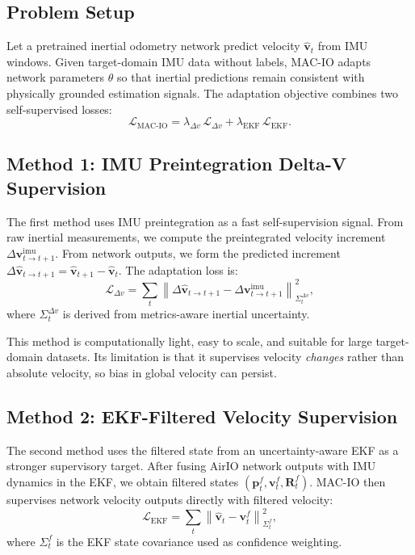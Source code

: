 \subsection{Problem Setup}

Let a pretrained inertial odometry network predict velocity $\hat{\mathbf{v}}_t$ from IMU windows.
Given target-domain IMU data without labels, MAC-IO adapts network parameters $\theta$ so that inertial predictions remain consistent with physically grounded estimation signals.
The adaptation objective combines two self-supervised losses:
\begin{equation}
\label{eq:macio:total}
\mathcal{L}_{\text{MAC-IO}} =
\lambda_{\Delta v}\,\mathcal{L}_{\Delta v}
+
\lambda_{\text{EKF}}\,\mathcal{L}_{\text{EKF}}.
\end{equation}

\subsection{Method 1: IMU Preintegration Delta-V Supervision}

The first method uses IMU preintegration as a fast self-supervision signal.
From raw inertial measurements, we compute the preintegrated velocity increment $\Delta\mathbf{v}^{\text{imu}}_{t\rightarrow t+1}$.
From network outputs, we form the predicted increment $\Delta\hat{\mathbf{v}}_{t\rightarrow t+1} = \hat{\mathbf{v}}_{t+1} - \hat{\mathbf{v}}_{t}$.
The adaptation loss is:
\begin{equation}
\label{eq:macio:deltav}
\mathcal{L}_{\Delta v} =
\sum_{t}
\left\|
\Delta\hat{\mathbf{v}}_{t\rightarrow t+1}
-
\Delta\mathbf{v}^{\text{imu}}_{t\rightarrow t+1}
\right\|_{\Sigma^{\Delta v}_{t}}^{2},
\end{equation}
where $\Sigma^{\Delta v}_{t}$ is derived from metrics-aware inertial uncertainty.

This method is computationally light, easy to scale, and suitable for large target-domain datasets.
Its limitation is that it supervises velocity \textit{changes} rather than absolute velocity, so bias in global velocity can persist.

\subsection{Method 2: EKF-Filtered Velocity Supervision}

The second method uses the filtered state from an uncertainty-aware EKF as a stronger supervisory target.
After fusing AirIO network outputs with IMU dynamics in the EKF, we obtain filtered states $(\mathbf{p}^{f}_t, \mathbf{v}^{f}_t, \mathbf{R}^{f}_t)$.
MAC-IO then supervises network velocity outputs directly with filtered velocity:
\begin{equation}
\label{eq:macio:ekf}
\mathcal{L}_{\text{EKF}} =
\sum_{t}
\left\|
\hat{\mathbf{v}}_{t}
-
\mathbf{v}^{f}_{t}
\right\|_{\Sigma^{f}_{t}}^{2},
\end{equation}
where $\Sigma^{f}_{t}$ is the EKF state covariance used as confidence weighting.

